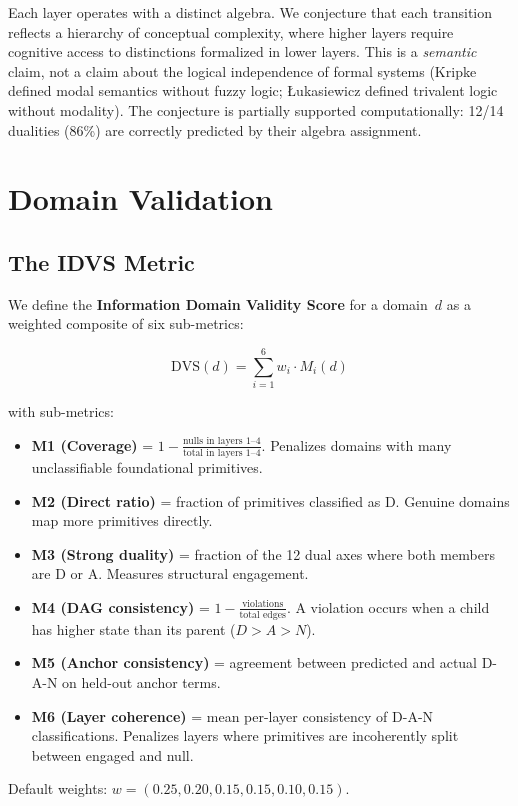 \documentclass[11pt, a4paper]{article}
\begin{document}
Each layer operates with a distinct algebra. We conjecture that each transition reflects a hierarchy of conceptual complexity, where higher layers require cognitive access to distinctions formalized in lower layers. This is a \emph{semantic} claim, not a claim about the logical independence of formal systems (Kripke defined modal semantics without fuzzy logic; \L{}ukasiewicz defined trivalent logic without modality). The conjecture is partially supported computationally: 12/14 dualities (86\%) are correctly predicted by their algebra assignment.

\section{Domain Validation}

\subsection{The IDVS Metric}

We define the \textbf{Information Domain Validity Score} for a domain~$d$ as a weighted composite of six sub-metrics:

$$\text{DVS}(d) = \sum_{i=1}^{6} w_i \cdot M_i(d)$$

\noindent with sub-metrics:
\begin{itemize}[nosep, leftmargin=*]
    \item \textbf{M1 (Coverage)} = $1 - \frac{\text{nulls in layers 1--4}}{\text{total in layers 1--4}}$. Penalizes domains with many unclassifiable foundational primitives.
    \item \textbf{M2 (Direct ratio)} = fraction of primitives classified as D. Genuine domains map more primitives directly.
    \item \textbf{M3 (Strong duality)} = fraction of the 12 dual axes where both members are D or A. Measures structural engagement.
    \item \textbf{M4 (DAG consistency)} = $1 - \frac{\text{violations}}{\text{total edges}}$. A violation occurs when a child has higher state than its parent ($D > A > N$).
    \item \textbf{M5 (Anchor consistency)} = agreement between predicted and actual D-A-N on held-out anchor terms.
    \item \textbf{M6 (Layer coherence)} = mean per-layer consistency of D-A-N classifications. Penalizes layers where primitives are incoherently split between engaged and null.
\end{itemize}
\noindent Default weights: $w = (0.25, 0.20, 0.15, 0.15, 0.10, 0.15)$.
\end{document}
